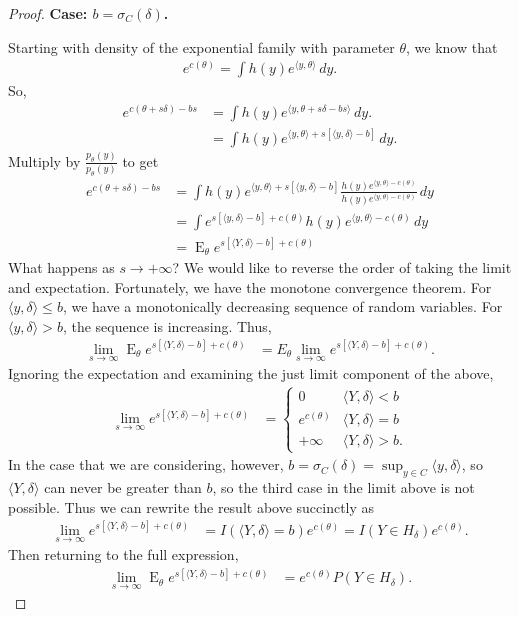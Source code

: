 \documentclass{amsbook}
\DeclareMathOperator{\E}{E}
\newcommand{\inner}[1]{\langle #1 \rangle}
\theoremstyle{definition}
\theoremstyle{remark}
\begin{document}
\begin{proof}

\textbf{Case: $b = \sigma_C(\delta)$.}

Starting with density of the exponential family with parameter $\theta$, we know that
\begin{align*}
	e^{c(\theta)} = \int h(y) e^{\inner{y,\theta}} \, dy.
\end{align*}
So,
\begin{align*}
	e^{ c(\theta + s \delta ) - bs } &= \int h(y) e^{\inner{y,\theta + s \delta - 
bs} } \, dy. \\
									&= \int h(y) e^{\inner{y,\theta}  + s [ \inner
{y,\delta} - b ] } \, dy. 
\end{align*}
Multiply by $\frac{p_\theta(y)}{p_\theta(y)}$ to get
\begin{align*}
	e^{ c(\theta + s \delta ) - bs } &= \int h(y) e^{\inner{y,\theta}  + s [ \inner
{y,\delta} - b ] }  \frac{ h(y)e^{\inner{y, \theta} - c(\theta)} }{ h(y)e^{\inner{y, 
\theta} - c(\theta)} }\, dy \\
	&= \int e^{  s [ \inner{y,\delta} - b ] + c(\theta) }  h(y)e^{\inner{y, \theta} - 
c(\theta)} \, dy \\
	&= \E_\theta e^{  s [ \inner{Y,\delta} - b ] + c(\theta) }
\end{align*}
What happens as $s \to +\infty$?  We would like to reverse the order of taking the 
limit and expectation.  Fortunately, we have the monotone convergence theorem.  For $
\inner{y, \delta} \leq b$, we have a monotonically decreasing sequence of random 
variables.  For $\inner{y, \delta} > b$, the sequence is increasing.  Thus,
\begin{align*}
	\lim_{s\to \infty} \E_\theta e^{  s [ \inner{Y,\delta} - b ] + c(\theta) } &= E_
\theta \lim_{s\to \infty} e^{  s [ \inner{Y,\delta} - b ] + c(\theta) }. 
\end{align*}
Ignoring the expectation and examining the just limit component of the above,
\begin{align*}
	\lim_{s\to \infty} e^{  s [ \inner{Y,\delta} - b ] + c(\theta) } &= 
			\begin{cases} 
			0 								& \inner{Y,\delta} < b \\
			e^{c(\theta)} 		 			& \inner{Y,\delta} = b \\
			+\infty							& \inner{Y,\delta} > b.
		\end{cases}
\end{align*}
In the case that we are considering, however, $b = \sigma_C(\delta) = \sup_{y \in C}
\inner{y,\delta}$, so $\inner{Y,\delta}$ can never be greater than $b$, so the third 
case in the limit above is not possible.  Thus we can rewrite the result above 
succinctly as
\begin{align*}
	\lim_{s\to \infty} e^{  s [ \inner{Y,\delta} - b ] + c(\theta) } &= I(\inner{Y,
\delta} = b ) e^{c(\theta)} 
	= I( Y \in H_\delta ) e^{c(\theta)}.
\end{align*}
Then returning to the full expression,
\begin{align*}
	\lim_{s\to \infty} \E_\theta e^{  s [ \inner{Y,\delta} - b ] + c(\theta) } &= e^
{c(\theta)} P( Y \in H_\delta ).
\end{align*}


\end{proof}
\end{document}
